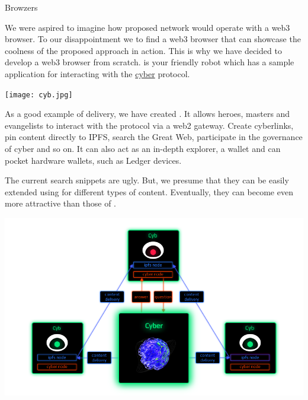 \documentclass[8pt,oneside]{amsart}
\makeatletter
\newcommand{\linkred}[2]{\href{#1}{\color{red}{#2}}}
\renewcommand\subsection{\@startsection{subsection}
                                    {2}{\z@}
                                    {-3.25ex\@plus -1ex \@minus -.2ex}
                                    {0ex \@plus .2ex}
                                    {\play\Large}
                        }
\newcommand{\titleSection}[1]{\subsection{#1}}
\newenvironment{Figure}
  {\par\medskip\noindent\minipage{\linewidth}}
  {\endminipage\par\medskip}
\makeatother
\begin{document}
\titleSection{Browzers}\label{browzers}

We were aspired to imagine how proposed network would operate with a web3 browser. To our disappointment we \linkred{https://github.com/cybercongress/cyb/blob/master/docs/comparison.md}{were not able} to find a web3 browser that can showcase the coolness of the proposed approach in action. This is why we have decided to develop a web3 browser from scratch. \linkred{https://cyb.ai}{Cyb} is your friendly robot which has a sample \linkred{https://cyber.page}{.cyber} application for interacting with the {\hyperref[cyber]{cyber}} protocol.

\begin{Figure}
  \medskip
  \centering
  \texttt{[image: cyb.jpg]}
  \medskip
\end{Figure}

As a good example of delivery, we have created \linkred{https://cyber.page/}{cyber.page}. It allows heroes, masters and evangelists to interact with the protocol via a web2 gateway. Create cyberlinks, pin content directly to IPFS, search the Great Web, participate in the governance of cyber and so on. It can also act as an in-depth explorer, a wallet and can pocket hardware wallets, such as Ledger devices.

The current search snippets are ugly. But, we presume that they can be easily extended using \linkred{https://github.com/ipld/specs}{IPLD} for different types of content. Eventually, they can become even more attractive than those of \linkred{https://google.com}{Google}.

\begin{Figure}
    \centering
    \includegraphics[width=1\textwidth]{architecture.png}
\end{Figure}
\end{document}
